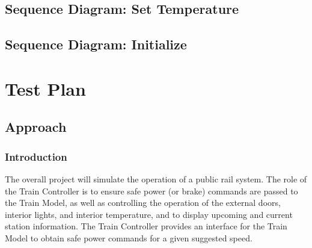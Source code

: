 \documentclass{scrreprt}
\begin{document}
\subsection{Sequence Diagram: Set Temperature}
\begin{center}
\end{center}

\subsection{Sequence Diagram: Initialize}
\begin{center}
\end{center}

\section{Test Plan}

\subsection{Approach}

\subsubsection{Introduction}
The overall project will simulate the operation of a public rail system. The role of the Train Controller is to ensure safe power (or brake) commands are passed to the Train Model, as well as controlling the operation of the external doors, interior lights, and interior temperature, and to display upcoming and current station information. The Train Controller provides an interface for the Train Model to obtain safe power commands for a given suggested speed.
\end{document}
